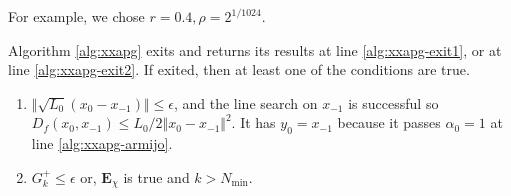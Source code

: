 \documentclass[12pt]{report}
\begin{document}
            For example, we chose $r= 0.4, \rho = 2^{1/1024}$. 
            \begin{observation}\label{obs:xxapg-exit-cond}
                Algorithm \ref{alg:xxapg} exits and returns its results at line \ref{alg:xxapg-exit1}, or at line \ref{alg:xxapg-exit2}. 
                If exited, then at least one of the conditions are true.
                \begin{enumerate}
                    \item $\Vert \sqrt{L_0}(x_0 - x_{-1})\Vert \le \epsilon$, and the line search on $x_{-1}$ is successful so $D_f(x_{0}, x_{-1}) \le L_0/2\Vert x_0 - x_{-1}\Vert^2$. It has $y_0 = x_{-1}$ because it passes $\alpha_0 = 1$ at line \ref{alg:xxapg-armijo}. 
                    \item $G_k^+ \le \epsilon$ or, $\mathbf E_\chi$ is true and $k > N_{\min}$. 
                \end{enumerate}
            \end{observation}
    
\end{document}
